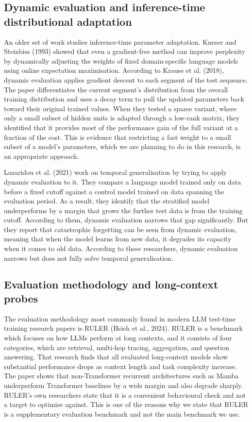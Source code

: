 \documentclass[12pt,a4paper]{article}
\begin{document}
\subsection*{Dynamic evaluation and inference-time distributional adaptation}

An older set of work studies inference-time parameter adaptation. Kneser and Steinbiss (1993) showed that even a gradient-free method can improve perplexity by dynamically adjusting the weights of fixed domain-specific language models using online expectation maximisation. According to Krause et al. (2018), dynamic evaluation applies gradient descent to each segment of the test sequence. The paper differentiates the current segment's distribution from the overall training distribution and uses a decay term to pull the updated parameters back toward their original trained values. When they tested a sparse variant, where only a small subset of hidden units is adapted through a low-rank matrix, they identified that it provides most of the performance gain of the full variant at a fraction of the cost. This is evidence that restricting a fast weight to a small subset of a model's parameters, which we are planning to do in this research, is an appropriate approach.

Lazaridou et al. (2021) work on temporal generalisation by trying to apply dynamic evaluation to it. They compare a language model trained only on data before a fixed cutoff against a control model trained on data spanning the evaluation period. As a result, they identify that the stratified model underperforms by a margin that grows the further test data is from the training cutoff. According to them, dynamic evaluation narrows that gap significantly. But they report that catastrophic forgetting can be seen from dynamic evaluation, meaning that when the model learns from new data, it degrades its capacity when it comes to old data. According to these researchers, dynamic evaluation narrows but does not fully solve temporal generalisation.

\subsection*{Evaluation methodology and long-context probes}

The evaluation methodology most commonly found in modern LLM test-time training research papers is RULER (Hsieh et al., 2024). RULER is a benchmark which focuses on how LLMs perform at long contexts, and it consists of four categories, which are retrieval, multi-hop tracing, aggregation, and question answering. That research finds that all evaluated long-context models show substantial performance drops as context length and task complexity increase. The paper shows that non-Transformer recurrent architectures such as Mamba underperform Transformer baselines by a wide margin and also degrade sharply. RULER's own researchers state that it is a convenient behavioural check and not a target to optimise against. This is one of the reasons why we state that RULER is a supplementary evaluation benchmark and not the main benchmark we use.
\end{document}
